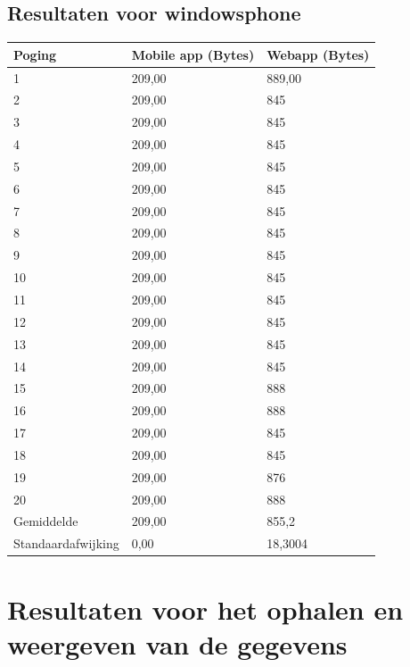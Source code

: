 \documentclass[pdftex,a4paper,12pt,twoside]{report}
\begin{document}
\subsection{Resultaten voor windowsphone}
\begin{center}
  \begin{tabular}{ | l | l | l |}
      \hline
      Poging & Mobile app (Bytes) & Webapp (Bytes)
      \\ \hline
      1 & 209,00 & 889,00
      \\ \hline
      2 & 209,00 & 845
      \\ \hline
      3 & 209,00 & 845
      \\ \hline
      4 & 209,00 & 845
      \\ \hline
      5 & 209,00 & 845
      \\ \hline
      6 & 209,00 & 845
      \\ \hline
      7 & 209,00 & 845
      \\ \hline
      8 & 209,00 & 845
      \\ \hline
      9 & 209,00 & 845
      \\ \hline
      10 & 209,00 & 845
      \\ \hline
      11 & 209,00 & 845
      \\ \hline
      12 & 209,00 & 845
      \\ \hline
      13 & 209,00 & 845
      \\ \hline
      14 & 209,00 & 845
      \\ \hline
      15 & 209,00 & 888
      \\ \hline
      16 & 209,00 & 888
      \\ \hline
      17 & 209,00 & 845
      \\ \hline
      18 & 209,00 & 845
      \\ \hline
      19 & 209,00 & 876
      \\ \hline
      20 & 209,00 & 888
      \\ \hline
      Gemiddelde & 209,00 & 855,2
      \\ \hline
      Standaardafwijking & 0,00 & 18,3004
      \\ \hline
  \end{tabular}
\end{center}
\newpage
\section{Resultaten voor het ophalen en weergeven van de gegevens}
\end{document}
